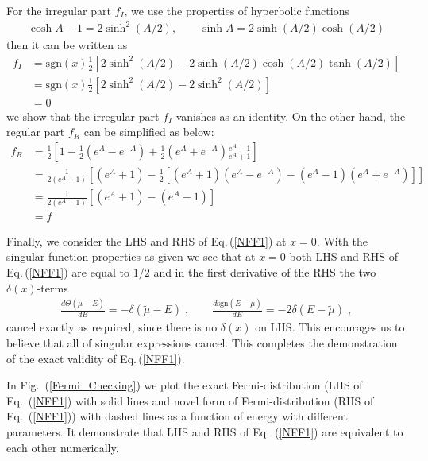 \documentclass[sn-mathphys,Numbered]{sn-jnl}
\theoremstyle{thmstyleone}%
\theoremstyle{thmstyletwo}%
\theoremstyle{thmstylethree}%
\begin{document}
For the irregular part $f_I$, we use the properties of hyperbolic functions
\begin{align}
\cosh A-1= 2\sinh^2(A/2), \qquad\sinh A=2 \sinh(A/2) \cosh(A/2)
\end{align}
then it can be written as
\begin{align}
f_I&=\mathrm{sgn}(x) \frac{1}{2} \left[ 2\sinh^2(A/2) - 2 \sinh(A/2) \cosh(A/2) \tanh (A/2)\right]\\
&=\mathrm{sgn}(x) \frac{1}{2}\left[2\sinh^2(A/2)-2\sinh^2(A/2)\right]\\
&=0
\end{align}
we show that the irregular part $f_I$ vanishes as an identity. On the other hand, the regular part $f_R$ can be simplified as below:
\begin{align}
f_R&=\frac{1}{2}\left[1-\frac{1}{2}\left(e^A-e^{-A}\right)+\frac{1}{2}\left(e^A+e^{-A}\right)\frac{e^A-1}{e^A+1}\right]\\
&=\frac{1}{2(e^A+1)}\left[\left(e^A+1\right)-\frac{1}{2}\left[\left(e^A+1\right)\left(e^A-e^{-A}\right)-\left(e^A-1\right)\left(e^A+e^{-A}\right)\right]\right]\\
&=\frac{1}{2(e^A+1)}\left[\left(e^A+1\right)-\left(e^A-1\right)\right]\\
&=f
\end{align}


Finally, we consider the LHS and RHS of Eq.\,(\ref{NFF1}) at $x=0$. With the singular function properties as given we see that at $x=0$ both LHS and RHS of Eq.\,(\ref{NFF1}) are equal to $1/2$ and in the first derivative of the  RHS the two $\delta(x)$-terms 
\begin{align}\label{NFF1b}
\frac{d\Theta(\tilde\mu-E)}{dE}=-\delta(\tilde\mu-E)\;,\qquad 
\frac{d\mathrm{sgn}(E -\tilde\mu)}{dE}=-2\delta(E-\tilde\mu)\;, 
 \end{align}
cancel exactly as required, since there is no $\delta(x)$ on LHS. This encourages us to believe that all of singular expressions cancel. This completes the demonstration of the exact validity of  Eq.\,(\ref{NFF1}). 

In Fig.~(\ref{Fermi_Checking}) we plot the exact Fermi-distribution (LHS of Eq.~(\ref{NFF1}) with solid lines and novel form of Fermi-distribution (RHS of Eq.~(\ref{NFF1})) with dashed lines as a function of energy with different parameters. It demonstrate that 
LHS and RHS of Eq.~(\ref{NFF1}) are equivalent to each other numerically.
\end{document}
